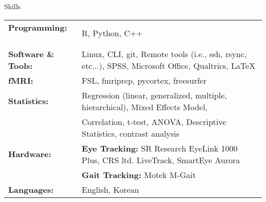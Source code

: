 \documentclass{resume} %
\begin{document}
\begin{rSection}{Skills}
    
    \begin{tabular}{ @{} >{\bfseries}l @{\hspace{3ex}} l }
        
        Programming: \ & R, Python, C++ \\%
        Software \& Tools: 
        & Linux, CLI, git, Remote tools (i.e., ssh, rsync, etc...), SPSS, Microsoft Office, Qualtrics, \LaTeX \\
        fMRI: \ & FSL, fmriprep, pycortex, freesurfer\\
        Statistics: \ & Regression (linear, generalized, multiple, hierarchical), Mixed Effects Model, \\
        \ & Correlation, t-test, ANOVA, Descriptive Statistics, contrast analysis \\
        Hardware: & {\textbf{Eye Tracking: }}SR Research  EyeLink 1000 Plus, CRS ltd. LiveTrack, SmartEye Aurora \\
        & {\textbf{Gait Tracking: }}Motek M-Gait \\
        Languages: \ &  English, Korean\\
        
    \end{tabular}
    
\end{rSection}


%    
%    
\end{document}
